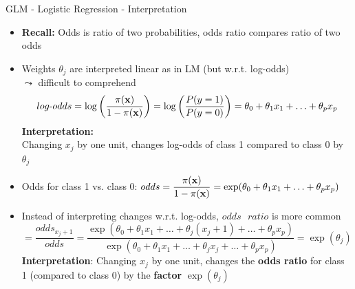 \documentclass[11pt,compress,t,notes=noshow, aspectratio=169, xcolor=table]{beamer}
\begin{document}
\begin{frame}[c]{GLM - Logistic Regression - Interpretation}

    \begin{itemize}
        \item \textbf{Recall:} Odds is ratio of two probabilities, odds ratio compares ratio of two odds 
        \item Weights $\theta_j$ are interpreted linear as in LM (but w.r.t. log-odds) \\
        $\leadsto$ difficult to comprehend
        $$log\text{-}odds = \log \left(\frac{\pi(\xv)}{1 - \pi(\xv)}\right) = \log \left(\frac{P(y=1)}{P(y=0)}\right) = \theta_0 + \theta_1 x_1 + \ldots + \theta_p x_p  $$
        \textbf{Interpretation:} \\ Changing $x_j$ by one unit, changes log-odds of class 1 compared to class 0 by $\theta_j$%
        \pause
        \item Odds for class 1 vs. class 0: %
        $odds = \displaystyle\frac{\pi(\xv)}{1 - \pi(\xv)}= \exp(\theta_0 + \theta_1 x_1 + \ldots + \theta_p x_p)$
        \item Instead of interpreting changes w.r.t. log-odds,  $odds\text{ }ratio$ is more common
        $$ = \frac{odds_{x_j+1}}{odds} = \frac{\exp(\theta_0 + \theta_1 x_1 + \ldots + \theta_j (x_j+1) + \ldots + \theta_p x_p)}{\exp(\theta_0 + \theta_1 x_1 + \ldots + \theta_j x_j + \ldots + \theta_p x_p)} = \exp{(\theta_j)} $$
        \textbf{Interpretation}: Changing $x_j$ by one unit, changes the \textbf{odds ratio} for class 1 (compared to class 0) by the \textbf{factor} $\exp(\theta_j)$
    \end{itemize}	

\end{frame}
\end{document}
